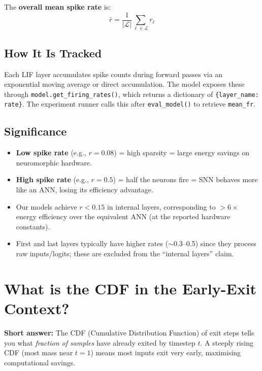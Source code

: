 \documentclass[11pt,a4paper]{article}
\begin{document}
The \textbf{overall mean spike rate} is:
\[
  \bar{r} = \frac{1}{|\mathcal{L}|} \sum_{\ell \in \mathcal{L}} r_\ell
\]

\subsection{How It Is Tracked}

Each LIF layer accumulates spike counts during forward passes via an
exponential moving average or direct accumulation. The model exposes these
through \texttt{model.get\_firing\_rates()}, which returns a dictionary of
\texttt{\{layer\_name: rate\}}. The experiment runner calls this after
\texttt{eval\_model()} to retrieve \texttt{mean\_fr}.

\subsection{Significance}

\begin{itemize}
  \item \textbf{Low spike rate} (e.g., $r = 0.08$) = high sparsity = large
        energy savings on neuromorphic hardware.
  \item \textbf{High spike rate} (e.g., $r = 0.5$) = half the neurons fire =
        SNN behaves more like an ANN, losing its efficiency advantage.
  \item Our models achieve $r < 0.15$ in internal layers, corresponding to
        $>6\times$ energy efficiency over the equivalent ANN (at the reported
        hardware constants).
  \item First and last layers typically have higher rates ($\sim$0.3--0.5)
        since they process raw inputs/logits; these are excluded from the
        ``internal layers'' claim.
\end{itemize}

\section{What is the CDF in the Early-Exit Context?}

\begin{answerbox}
\textbf{Short answer:} The CDF (Cumulative Distribution Function) of exit steps
tells you what \emph{fraction of samples} have already exited by timestep $t$.
A steeply rising CDF (most mass near $t=1$) means most inputs exit very early,
maximising computational savings.
\end{answerbox}
\end{document}
